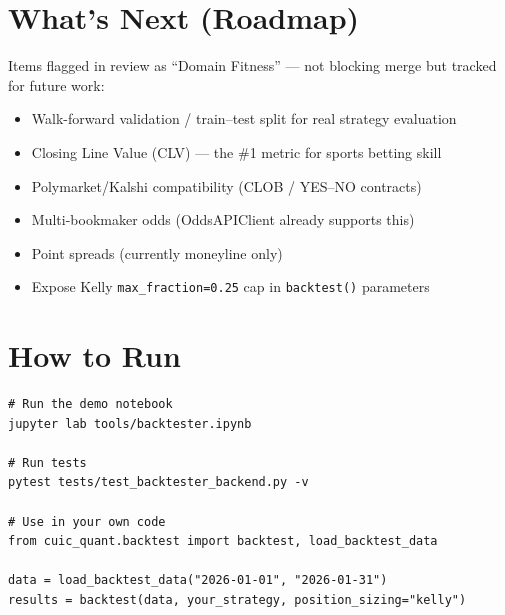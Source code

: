 \documentclass[11pt,a4paper]{article}
\begin{document}
\section{What's Next (Roadmap)}

Items flagged in review as ``Domain Fitness'' --- not blocking merge but tracked for future work:

\begin{itemize}[nosep]
    \item Walk-forward validation / train--test split for real strategy evaluation
    \item Closing Line Value (CLV) --- the \#1 metric for sports betting skill
    \item Polymarket/Kalshi compatibility (CLOB / YES--NO contracts)
    \item Multi-bookmaker odds (OddsAPIClient already supports this)
    \item Point spreads (currently moneyline only)
    \item Expose Kelly \texttt{max\_fraction=0.25} cap in \texttt{backtest()} parameters
\end{itemize}

\section{How to Run}

\begin{lstlisting}
# Run the demo notebook
jupyter lab tools/backtester.ipynb

# Run tests
pytest tests/test_backtester_backend.py -v

# Use in your own code
from cuic_quant.backtest import backtest, load_backtest_data

data = load_backtest_data("2026-01-01", "2026-01-31")
results = backtest(data, your_strategy, position_sizing="kelly")
\end{lstlisting}
\end{document}
